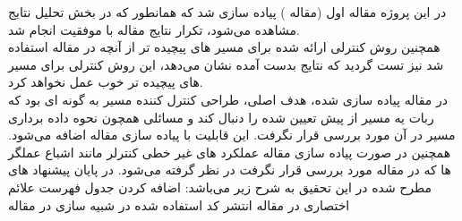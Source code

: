 در این پروژه مقاله اول (مقاله \آ) پیاده سازی شد که همانطور که در بخش تحلیل نتایج مشاهده می‌‌‌‌‌‌شود، تکرار نتایج مقاله با موفقیت انجام شد.\\
همچنین روش کنترلی ارائه شده برای مسیر های پیچیده تر از آنچه در مقاله استفاده شد نیز تست گردید که نتایج بدست آمده نشان می‌دهد، این روش کنترلی برای مسیر های پیچیده تر خوب عمل نخواهد کرد.\\
در مقاله پیاده سازی شده، هدف اصلی، طراحی کنترل کننده مسیر به گونه ای بود که ربات یه مسیر از پیش تعیین شده را دنبال کند و مسائلی همچون نحوه داده برداری مسیر در آن مورد بررسی قرار نگرفت. این قابلیت با پیاده سازی مقاله \ب اضافه می‌شود. همچنین در صورت پیاده سازی مقاله \پ  عملکرد های غیر خطی کنترلر مانند اشباع عملگر ها که در مقاله \آ مورد بررسی قرار نگرفت در نظر گرفته می‌شود.  
در پایان  پیشنهاد های مطرح شده در این تحقیق به شرح زیر می‌باشد:
 اضافه کردن جدول فهرست علائم اختصاری در مقاله \آ
 انتشر کد استفاده شده در شبیه سازی در مقاله \آ
